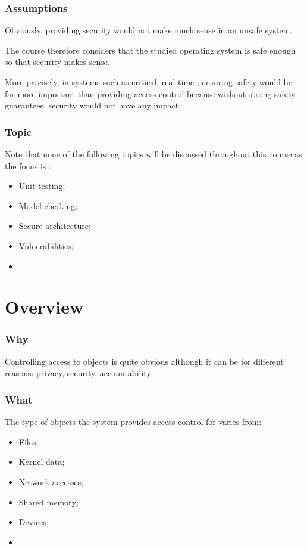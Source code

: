 
\begin{frame}
  \frametitle{Assumptions}

  Obviously, providing security would not make much sense in an unsafe
  system.

  \-

  The course therefore considers that the studied operating system
  is safe enough so that security makes sense.

  \-

  More precisely, in systems such as critical, real-time \etc{},
  ensuring safety would be far more important than providing access control
  because without strong safety guarantees, security would not have any impact.
\end{frame}


\begin{frame}
  \frametitle{Topic}

  Note that none of the following topics will be discussed throughout this
  course as the focus is :

  \-

  \begin{itemize}
    \item
      Unit testing;
    \item
      Model checking;
    \item
      Secure architecture;
    \item
      Vulnerabilities;
    \item
      \etc{}
  \end{itemize}
\end{frame}

%
%

\section{Overview}


\begin{frame}
  \frametitle{Why}

  Controlling access to objects is quite obvious although it can be for
  different reasons: privacy, security, accountability \etc{}
\end{frame}


\begin{frame}
  \frametitle{What}

  The type of objects the system provides access control for varies from:

  \begin{itemize}
    \item
      Files;
    \item
      Kernel data;
    \item
      Network accesses;
    \item
      Shared memory;
    \item
      Devices;
    \item
      \etc{}
  \end{itemize}
\end{frame}

